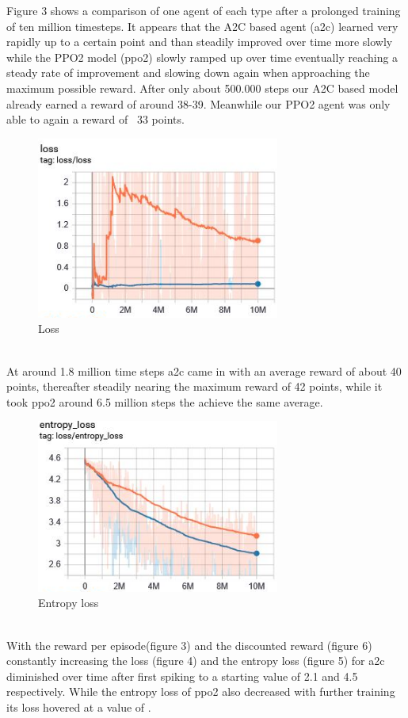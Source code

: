\documentclass[sigconf]{acmart}
\begin{document}
Figure 3 shows a comparison of one agent of each type after a prolonged training of ten million timesteps. It appears that the A2C based agent (a2c) learned very rapidly up to a certain point and than steadily improved over time more slowly while the PPO2 model (ppo2) slowly ramped up over time eventually reaching a steady rate of improvement and slowing down again when approaching the maximum possible reward. After only about 500.000 steps our A2C based model already earned a reward of around 38-39. Meanwhile our PPO2 agent was only able to again a reward of ~33 points.

\begin{figure}[ht]
 \centering
 \includegraphics[width=80mm]{loss.png}
  \caption{Loss}
  \label{fig:loss}
\end{figure}
\\

At around 1.8 million time steps a2c came in with an average reward of about 40 points, thereafter steadily nearing the maximum reward of 42 points, while it took ppo2 around 6.5 million steps the achieve the same average.
\begin{figure}[ht]
 \centering
 \includegraphics[width=80mm]{eloss.png}
  \caption{Entropy loss}
  \label{fig:loss}
\end{figure}
\\

With the reward per episode(figure 3) and the discounted reward (figure 6) constantly increasing the loss (figure 4) and the entropy loss (figure 5) for a2c diminished over time after first spiking to a starting value of 2.1 and 4.5 respectively. While the entropy loss of ppo2 also decreased with further training its loss hovered at a value of .
\end{document}

